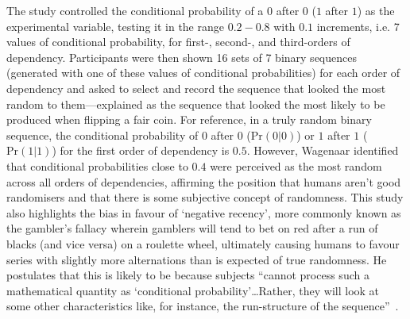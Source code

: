 The study controlled the conditional probability of a $0$ after $0$ ($1$ after $1$) as the experimental variable, testing it in the range $0.2-0.8$ with $0.1$ increments, i.e. 7 values of conditional probability, for first-, second-, and third-orders of dependency. Participants were then shown 16 sets of 7 binary sequences (generated with one of these values of conditional probabilities) for each order of dependency and asked to select and record the sequence that looked the most random to them—explained as the sequence that looked the most likely to be produced when flipping a fair coin. For reference, in a truly random binary sequence, the conditional probability of $0$ after $0$ ($\text{Pr}(0|0)$) or $1$ after $1$ ($\text{Pr}(1|1)$) for the first order of dependency is $0.5$. However, Wagenaar identified that conditional probabilities close to $0.4$ were perceived as the most random across all orders of dependencies, affirming the position that humans aren't good randomisers and that there is some subjective concept of randomness. This study also highlights the bias in favour of `negative recency', more commonly known as the gambler's fallacy wherein gamblers will tend to bet on red after a run of blacks (and vice versa) on a roulette wheel, ultimately causing humans to favour series with slightly more alternations than is expected of true randomness. He postulates that this is likely to be because subjects ``cannot process such a mathematical quantity as `conditional probability'\ldots Rather, they will look at some other characteristics like, for instance, the run-structure of the sequence''~\cite{wagenaar:1970}.


